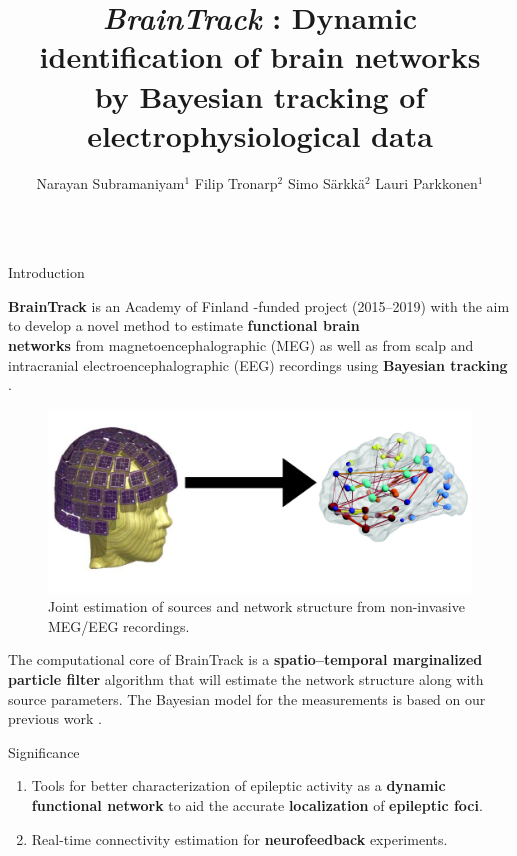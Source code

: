 \documentclass[serif,final]{beamer}
\title{\textit{BrainTrack} : Dynamic identification of brain networks \\ by Bayesian tracking of electrophysiological data}
\author{Narayan Subramaniyam$^{1}$ \quad Filip Tronarp$^{2}$ \quad Simo S\"arkk\"a$^{2}$ \quad Lauri Parkkonen$^{1}$}
\institute{$^{1}$ Department of Neuroscience and Biomedical Engineering \\ $^{2}$ Department of Electrical Engineering and Automation}
\begin{document}
\begin{frame}{}
  \begin{columns}[t]

    \begin{column}{0.45\linewidth}

      \begin{block}{Introduction}
      \begin{flushleft}
			\textbf{\color{blue} BrainTrack} is an Academy of Finland -funded project (2015--2019) with the aim to develop a novel method to estimate \textbf{\color{blue}functional brain \\ networks} from magnetoencephalographic (MEG) as well as from scalp and intracranial electroencephalographic (EEG) recordings using \textbf{\color{blue} Bayesian tracking} \cite{sarkka2013bayesian}.
	\end{flushleft}
    \begin{figure}
          \centering
          \includegraphics[scale=0.75]{intro_1}
          \caption{Joint estimation of sources and network structure from non-invasive MEG/EEG recordings.}
           \label{fig1}
    \end{figure}
The computational core of BrainTrack is a \textbf{\color{blue} spatio--temporal marginalized particle filter} algorithm \cite{sarkka2013bayesian} that will estimate the network structure along with source parameters. The Bayesian model for the measurements is based on our previous work \cite{sorrentino2009dynamical,chen2013probabilistic}.
    \end{block}

    \begin{block}{Significance}
        \begin{enumerate}
		\setlength\itemsep{0.25em}
		\item Tools for better characterization of epileptic activity as a \textbf{\color {blue} dynamic functional network} to aid the accurate 	\textbf{\color {blue} localization} of \textbf{\color {blue} epileptic foci}.
		\item Real-time connectivity estimation for \textbf{\color {blue} neurofeedback} experiments.
		\end{enumerate}
    \end{block}


\end{column}
\end{columns}
\end{frame}
\end{document}

